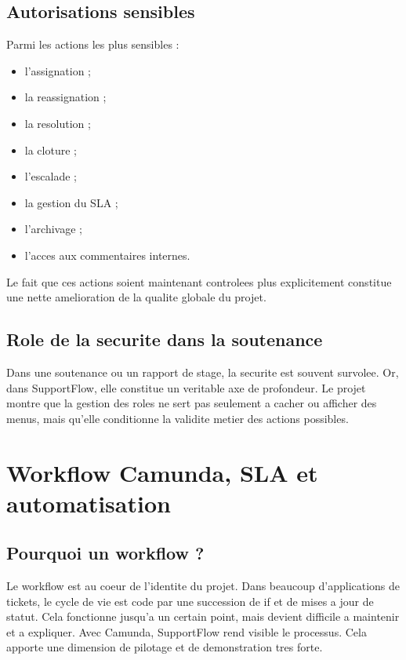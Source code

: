 \documentclass[12pt,a4paper,oneside]{report}
\begin{document}
\section{Autorisations sensibles}

Parmi les actions les plus sensibles :

\begin{itemize}[leftmargin=1.2cm]
  \item l'assignation ;
  \item la reassignation ;
  \item la resolution ;
  \item la cloture ;
  \item l'escalade ;
  \item la gestion du SLA ;
  \item l'archivage ;
  \item l'acces aux commentaires internes.
\end{itemize}

Le fait que ces actions soient maintenant controlees plus explicitement constitue une nette amelioration de la qualite globale du projet.

\section{Role de la securite dans la soutenance}

Dans une soutenance ou un rapport de stage, la securite est souvent survolee. Or, dans SupportFlow, elle constitue un veritable axe de profondeur. Le projet montre que la gestion des roles ne sert pas seulement a cacher ou afficher des menus, mais qu'elle conditionne la validite metier des actions possibles.

\chapter{Workflow Camunda, SLA et automatisation}

\section{Pourquoi un workflow ?}

Le workflow est au coeur de l'identite du projet. Dans beaucoup d'applications de tickets, le cycle de vie est code par une succession de if et de mises a jour de statut. Cela fonctionne jusqu'a un certain point, mais devient difficile a maintenir et a expliquer. Avec Camunda, SupportFlow rend visible le processus. Cela apporte une dimension de pilotage et de demonstration tres forte.
\end{document}
